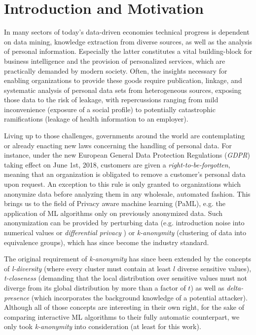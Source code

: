 \documentclass{llncs}
\begin{document}
\renewcommand{\thesubfigure}{\thefigure.\arabic{subfigure}}
\makeatletter
\renewcommand{\p@subfigure}{}
\renewcommand{\@thesubfigure}{\thesubfigure:\hskip\subfiglabelskip}
\makeatother


\section{Introduction and Motivation}
\label{sect:intro_moti}

In many sectors of today's data-driven economies technical progress is dependent on data mining, knowledge extraction from diverse sources, as well as the analysis of personal information. Especially the latter constitutes a vital building-block for business intelligence and the provision of personalized services, which are practically demanded by modern society. Often, the insights necessary for enabling organizations to provide these goods require publication, linkage, and systematic analysis of personal data sets from heterogeneous sources, exposing those data to the risk of leakage, with repercussions ranging from mild inconvenience (exposure of a social profile) to potentially catastrophic ramifications (leakage of health information to an employer).

Living up to those challenges, governments around the world are contemplating or already enacting new laws concerning the handling of personal data. For instance, under the new European General Data Protection Regulations (\textit{GDPR}) taking effect on June 1st, 2018, customers are given a \textit{right-to-be-forgotten}, meaning that an organization is obligated to remove a customer's personal data upon request. An exception to this rule is only granted to organizations which anonymize data before analyzing them in any wholesale, automated fashion. This brings us to the field of Privacy aware machine learning (PaML), e.g. the application of ML algorithms only on previously anonymized data. Such anonymization can be provided by perturbing data (e.g. introduction noise into numerical values or \textit{differential privacy} \cite{dwork2008differential}) or \textit{k-anonymity} \cite{Sweeney:2002:k-Anonymity} (clustering of data into equivalence groups), which has since become the industry standard.

The original requirement of \textit{k-anonymity} has since been extended by the concepts of \textit{l-diversity} \cite{MachanavajjhalaEtAl:2007:l-Diversity} (where every cluster must contain at least $l$ diverse sensitive values), \textit{t-closeness} \cite{LiEtAl:2007:t-closeness} (demanding that the local distribution over sensitive values must not diverge from its global distribution by more than a factor of $t$) as well as \textit{delta-presence} \cite{NergizClifton:2010:Delta-Presence} (which incorporates the background knowledge of a potential attacker). Although all of those concepts are interesting in their own right, for the sake of comparing interactive ML algorithms to  their fully automatic counterpart, we only took \textit{k-anonymity} into consideration (at least for this work).
\end{document}
